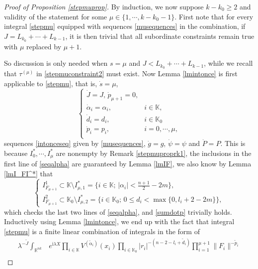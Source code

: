 \documentclass[11pt,reqno]{amsart}
\numberwithin{equation}{section}
\theoremstyle{definition}
\begin{document}
\begin{proof}[Proof of Proposition \ref{stepmuprop}]
	By induction, we now suppose $k-k_0\geq2$ and validity of the statement for some $\mu\in\{1,\cdots,k-k_0-1\}$. First note that for every integral \eqref{stepmu} equipped with sequences \eqref{musequences} in the combination, if $J=L_{k_0}+\cdots+L_{k-1}$, it is then trivial that all subordinate constraints remain true with $\mu$ replaced by $\mu+1$.
	
	So discussion is only needed when $s=\mu$ and $J<L_{k_0}+\cdots+L_{k-1}$, while we recall that $\tau^{(\mu)}$ in \eqref{stepmuconstraint2} must exist. Now Lemma \ref{lmintonce} is first applicable to \eqref{stepmu}, that is, $\dot{s}=\mu$,
	\begin{equation*}
		\begin{cases}
			\dot{J}=J,\,\dot{p}_{\mu+1}=0,\\
			\dot{\alpha}_i=\alpha_i,\quad&i\in\mathbb{K},\\
			\dot{d}_i=d_i,&i\in\mathbb{K}_0\\
			\dot{p}_i=p_i,&i=0,\cdots,\mu,\\
		\end{cases}
	\end{equation*}
	sequences \eqref{intonceseq} given by \eqref{musequences}, $\dot{g}=g$, $\dot{\psi}=\psi$ and $\dot{P}=P$. This is because $I_0^*,\cdots,I_\mu^*$ are nonempty by Remark \ref{stepmuproprk1}, the inclusions in the first line of \eqref{seqalpha} are guaranteed by Lemma \ref{lmIF}, we also know by Lemma \ref{lmI_FI^*} that
	\begin{equation*}
		\begin{cases}
			I_{F_{\mu+1}}^1\subset\mathbb{K}\setminus I_{\mu,1}^*=\{i\in\mathbb{K};\,|\alpha_i|<\frac{n+1}{2}-2m\},\\
			I_{F_{\mu+1}}^2\subset\mathbb{K}_0\setminus I_{\mu,2}^*=\{i\in\mathbb{K}_0;\,0\leq d_i<\max\{0,l_i+2-2m\}\},
		\end{cases}
	\end{equation*}
	which checks the last two lines of \eqref{seqalpha}, and \eqref{sumdotp} trivially holds. Inductively using Lemma \ref{lmintonce}, we end up with the fact that integral \eqref{stepmu} is a finite linear combination of integrals in the form of
	\begin{equation}\label{tildeJ}
		\begin{split}
			\lambda^{-\tilde{J}}\int_{\mathbb{R}^{nk}}&e^{\mathrm{i}\lambda X}\prod_{i\in\mathbb{K}}V^{(\tilde{\alpha}_i)}(x_i)\prod_{i\in\mathbb{K}_0}|r_i|^{-(n-2-l_i+\tilde{d}_i)}\prod_{i=1}^{\mu+1}\|F_i\|^{-{\tilde{p}_i}}\\

\end{split}
\end{equation}
\end{proof}
\end{document}
